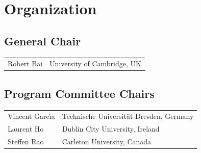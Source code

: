 \documentclass[runningheads]{llncs}
\begin{document}
\chapter*{Organization}
\setlength{\tabcolsep}{0pt}     %
\setlength{\LTpre}{0pt}         %

\section*{General Chair}
\begin{longtable}{p{}p{}}
Robert Bai          & University of Cambridge, UK
\end{longtable}

\section*{Program Committee Chairs}
\begin{longtable}{p{}p{}}
Vincent Garc\'{\i}a & Technische Universit\"{a}t Dresden, Germany\\
Laurent Ho          & Dublin City University, Ireland\\
Steffen Rao         & Carleton University, Canada\\
\end{longtable}
\end{document}
